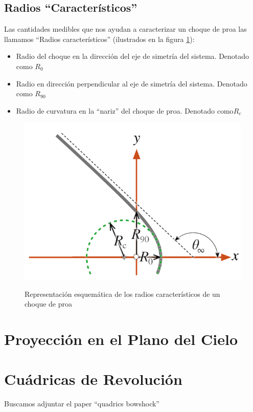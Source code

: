 \subsection{Radios ``Caracter\'isticos''}

Las cantidades medibles que nos ayudan a caracterizar un choque de proa las
llamamos ``Radios caracter\'isticos'' (ilustrados en la figura
\ref{fig:char-radii}):
\begin{itemize}
\item Radio del choque en la direcci\'on del eje de simetr\'ia del sistema.
  Denotado como $R_0$
\item Radio en direcci\'on perpendicular al eje de simetr\'ia del sistema.
  Denotado como $R_{90}$
\item Radio de curvatura en la ``nariz'' del choque de proa. Denotado
  como$ R_c$
\end{itemize}

\begin{figure}
  \includegraphics[width=\linewidth]{./Figures/characteristic-radii}
  \label{fig:char-radii}
  \caption{Representaci\'on esquem\'atica de los radios caracter\'isticos
  de un choque de proa}
\end{figure}



\section{Proyecci\'on en el Plano del Cielo}
\section{Cu\'adricas de Revoluci\'on}

Buscamos adjuntar el paper ``quadrics bowshock''
